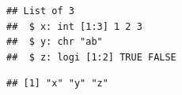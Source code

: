 \documentclass[krantz2]{krantz}\usepackage{knitr}
\begin{document}
\begin{knitrout}\footnotesize
{}\color{fgcolor}\begin{kframe}
\begin{alltt}
\end{alltt}
\begin{verbatim}
## List of 3
##  $ x: int [1:3] 1 2 3
##  $ y: chr "ab"
##  $ z: logi [1:2] TRUE FALSE
\end{verbatim}
\begin{alltt}
\end{alltt}
\begin{verbatim}
## [1] "x" "y" "z"
\end{verbatim}
\end{kframe}
\end{knitrout}
\end{document}
